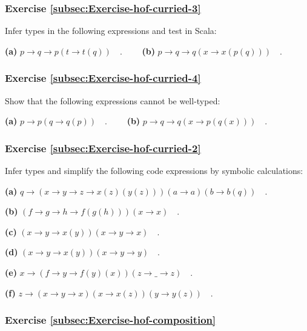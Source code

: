 \subsubsection{Exercise \label{subsec:Exercise-hof-curried-3}\ref{subsec:Exercise-hof-curried-3}}

Infer types in the following expressions and test in Scala:

\textbf{(a)} $p\rightarrow q\rightarrow p(t\rightarrow t(q))\quad.\quad\quad$
\textbf{(b)} $p\rightarrow q\rightarrow q(x\rightarrow x(p(q)))\quad.$

\subsubsection{Exercise \label{subsec:Exercise-hof-curried-4}\ref{subsec:Exercise-hof-curried-4}}

Show that the following expressions cannot be well-typed:

\textbf{(a)} $p\rightarrow p(q\rightarrow q(p))\quad.\quad\quad$\textbf{
(b)} $p\rightarrow q\rightarrow q(x\rightarrow p(q(x)))\quad.$

\subsubsection{Exercise \label{subsec:Exercise-hof-curried-2}\ref{subsec:Exercise-hof-curried-2}}

Infer types and simplify the following code expressions by symbolic
calculations:

\textbf{(a)} $q\rightarrow\left(x\rightarrow y\rightarrow z\rightarrow x(z)(y(z))\right)\left(a\rightarrow a\right)\left(b\rightarrow b(q)\right)\quad.$

\textbf{(b)} $\left(f\rightarrow g\rightarrow h\rightarrow f(g(h))\right)(x\rightarrow x)\quad.$

\textbf{(c)} $\left(x\rightarrow y\rightarrow x(y)\right)\left(x\rightarrow y\rightarrow x\right)\quad.$

\textbf{(d)} $\left(x\rightarrow y\rightarrow x(y)\right)\left(x\rightarrow y\rightarrow y\right)\quad.$

\textbf{(e)} $x\rightarrow\left(f\rightarrow y\rightarrow f(y)(x)\right)\left(z\rightarrow\_\rightarrow z\right)\quad.$

\textbf{(f)} $z\rightarrow\left(x\rightarrow y\rightarrow x\right)\left(x\rightarrow x(z)\right)(y\rightarrow y(z))\quad.$

\subsubsection{Exercise \label{subsec:Exercise-hof-composition}\ref{subsec:Exercise-hof-composition}}

